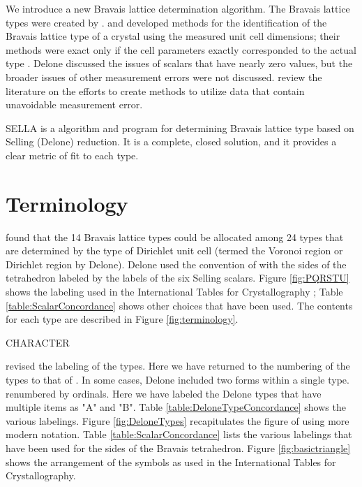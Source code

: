 \documentclass[preprint]{iucr}              %
\begin{document}
We introduce a new Bravais lattice determination algorithm. The Bravais 
lattice types were created by .  
and  developed methods for the identification 
of the Bravais lattice type of a crystal using the measured unit cell 
dimensions; their methods were exact only if the cell parameters 
exactly corresponded to the actual type \cite{Patterson1957}. 
Delone discussed the issues of scalars that have nearly zero values, 
but the broader issues of other measurement errors were not 
discussed.  review the literature on 
the efforts to create methods to utilize data that contain unavoidable 
measurement error.

SELLA is a algorithm and program for determining Bravais lattice 
type based on Selling (Delone) reduction. It is a complete, closed solution, and it provides a clear metric of fit to each type.

\section{Terminology}

 found that the 14 Bravais lattice types 
could be allocated among 24 types that are determined by the 
type of Dirichlet unit cell (termed the Voronoi region \cite{Voronoi1908} or 
Dirichlet region \cite{dirichlet1850} by 
Delone). Delone used the convention of 
with the sides of the tetrahedron labeled by the labels of the six
Selling scalars. Figure \ref{fig:PQRSTU} shows the labeling used in
the International Tables for Crystallography \cite{Henry1952}; 
Table \ref{table:ScalarConcordance} shows other choices that have been used. The
 contents for each type are described in Figure \ref{fig:terminology}.

CHARACTER

 revised the labeling of the types.
Here we have returned to the numbering of the types to that 
of .
In some cases, Delone included two forms within a single 
type. 
renumbered by ordinals. Here we have labeled the Delone 
types that have multiple items as "A" and "B". Table \ref{table:DeloneTypeConcordance}
shows the various labelings. Figure \ref{fig:DeloneTypes} 
recapitulates the figure of  using 
more modern notation. Table \ref{table:ScalarConcordance} 
lists the various labelings that have been 
used for the sides of the Bravais tetrahedron. 
Figure \ref{fig:basictriangle} shows the arrangement of the 
symbols as used in the International Tables for Crystallography.
\end{document}
